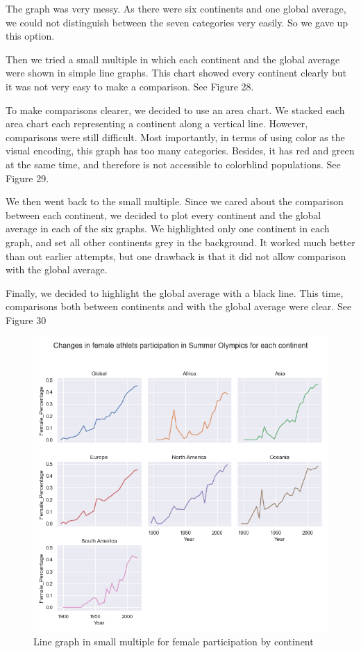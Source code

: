 \documentclass[12pt]{article}
\begin{document}
The graph was very messy. As there were six continents and one global average, we could not distinguish between the seven categories very easily. So we gave up this option. 

Then we tried a small multiple in which each continent and the global average were shown in simple line graphs. This chart showed every continent clearly but it was not very easy to make a comparison. See Figure 28.

To make comparisons clearer, we decided to use an area chart. We stacked each area chart each representing a continent along a vertical line. However, comparisons were still difficult. Most importantly, in terms of using color as the visual encoding, this graph has too many categories. Besides, it has red and green at the same time, and therefore is not accessible to colorblind populations. See Figure 29.

We then went back to the small multiple. Since we cared about the comparison between each continent, we decided to plot every continent and the global average in each of the six graphs. We highlighted only one continent in each graph, and set all other continents grey in the background. It worked much better than out earlier attempts, but one drawback is that it did not allow comparison with the global average. 

Finally, we decided to highlight the global average with a black line. This time, comparisons both between continents and with the global average were clear. See Figure 30
\begin{figure}
    \centering
    \includegraphics[scale=0.35]{pics/g-2-2.png}
    \caption{Line graph in small multiple for female participation by continent}
    \label{fig:my_label}
\end{figure}
\end{document}
